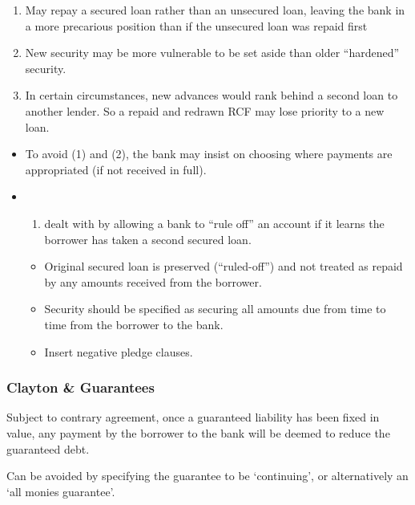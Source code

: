 \documentclass[
]{article}
\newenvironment{Shaded}{}{}
\newcommand{\NormalTok}[1]{#1}
\providecommand{\tightlist}{%
  \setlength{\itemsep}{0pt}\setlength{\parskip}{0pt}}
\begin{document}
\begin{enumerate}
\def\labelenumi{\arabic{enumi}.}
\tightlist
\item
  May repay a secured loan rather than an unsecured loan, leaving the
  bank in a more precarious position than if the unsecured loan was
  repaid first
\item
  New security may be more vulnerable to be set aside than older
  ``hardened'' security.
\item
  In certain circumstances, new advances would rank behind a second loan
  to another lender. So a repaid and redrawn RCF may lose priority to a
  new loan.
\end{enumerate}

\begin{itemize}
\item
  To avoid (1) and (2), the bank may insist on choosing where payments
  are appropriated (if not received in full).
\item
  \begin{enumerate}
  \def\labelenumi{(\arabic{enumi})}
  \setcounter{enumi}{2}
  \tightlist
  \item
    dealt with by allowing a bank to ``rule off'' an account if it
    learns the borrower has taken a second secured loan.
  \end{enumerate}

  \begin{itemize}
  \tightlist
  \item
    Original secured loan is preserved (``ruled-off'') and not treated
    as repaid by any amounts received from the borrower.
  \item
    Security should be specified as securing all amounts due from time
    to time from the borrower to the bank.
  \item
    Insert negative pledge clauses.
  \end{itemize}
\end{itemize}

\hypertarget{clayton-guarantees}{%
\subsubsection{Clayton \& Guarantees}\label{clayton-guarantees}}

Subject to contrary agreement, once a guaranteed liability has been
fixed in value, any payment by the borrower to the bank will be deemed
to reduce the guaranteed debt.

\begin{Shaded}
\begin{Highlighting}[]
\NormalTok{Can be avoided by specifying the guarantee to be ‘continuing’, or alternatively an ‘all monies guarantee’.}
\end{Highlighting}
\end{Shaded}
\end{document}
